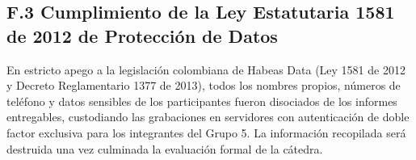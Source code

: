 \documentclass[11pt,a4paper]{article}
\begin{document}
\subsection{F.3 Cumplimiento de la Ley Estatutaria 1581 de 2012 de Protecci\'on de Datos}
En estricto apego a la legislaci\'on colombiana de Habeas Data (Ley 1581 de 2012 y Decreto Reglamentario 1377 de 2013), todos los nombres propios, n\'umeros de tel\'efono y datos sensibles de los participantes fueron disociados de los informes entregables, custodiando las grabaciones en servidores con autenticaci\'on de doble factor exclusiva para los integrantes del Grupo 5. La informaci\'on recopilada ser\'a destruida una vez culminada la evaluaci\'on formal de la c\'atedra.
\end{document}
